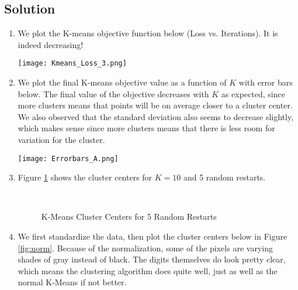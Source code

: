 \documentclass[submit]{harvardml}
\begin{document}
\subsection*{Solution}

\begin{enumerate}
    \item We plot the K-means objective function below (Loss vs. Iterations). It is indeed decreasing!
    
    \texttt{[image: Kmeans\_Loss\_3.png]}
    
    \item We plot the final K-means objective value as a function of $K$ with error bars below. The final value of the objective decreases with $K$ as expected, since more clusters means that points will be on average closer to a cluster center. We also observed that the standard deviation also seems to decrease slightly, which makes sense since more clusters means that there is less room for variation for the cluster.
    
    \texttt{[image: Errorbars\_A.png]}
    \newpage 
    \item Figure \ref{fig:kmeans} shows the cluster centers for $K = 10$ and 5 random restarts.

    \begin{figure}[H]
    \centering
     \\
    \caption{K-Means Cluster Centers for 5 Random Restarts}
    \label{fig:kmeans}
    \end{figure}
    
    \newpage
    \item We first standardize the data, then plot the cluster centers below in Figure \ref{fig:norm}. Because of the normalization, some of the pixels are varying shades of gray instead of black. The digits themselves do look pretty clear, which means the clustering algorithm does quite well, just as well as the normal K-Means if not better.
    
    \begin{figure}[H]
    \centering
     \\
    

\end{figure}
\end{enumerate}
\end{document}
